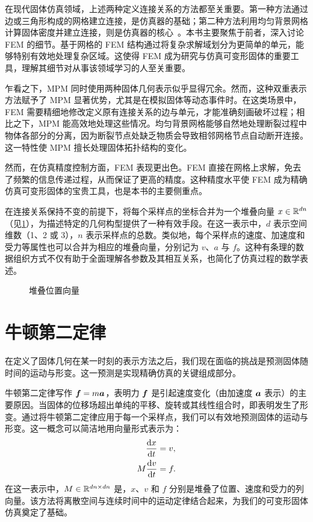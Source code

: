 在现代固体仿真领域，上述两种定义连接关系的方法都至关重要。第一种方法通过边或三角形构成的网格建立连接，是仿真器的基础；第二种方法利用均匀背景网格计算固体密度并建立连接，则是仿真器的核心~\cite{jiang2016material}。本书主要聚焦于前者，深入讨论 FEM 的细节。基于网格的 FEM 结构通过将复杂求解域划分为更简单的单元，能够特别有效地处理复杂区域。这使得 FEM 成为研究与仿真可变形固体的重要工具，理解其细节对从事该领域学习的人至关重要。

乍看之下，MPM 同时使用两种固体几何表示似乎显得冗余。然而，这种双重表示方法赋予了 MPM 显著优势，尤其是在模拟固体等动态事件时。在这类场景中，FEM 需要精细地修改定义原有连接关系的边与单元，才能准确刻画破坏过程；相比之下，MPM 能高效地处理这些情况。均匀背景网格能够自然地处理断裂过程中物体各部分的分离，因为断裂节点处缺乏物质会导致相邻网格节点自动断开连接。这一特性使 MPM 擅长处理固体拓扑结构的变化。

然而，在仿真精度控制方面，FEM 表现更出色。FEM 直接在网格上求解，免去了频繁的信息传递过程，从而保证了更高的精度。这种精度水平使 FEM 成为精确仿真可变形固体的宝贵工具，也是本书的主要侧重点。

在连接关系保持不变的前提下，将每个采样点的坐标合并为一个堆叠向量 $x \in \mathbb{R}^{dn}$（见\allowbreak\cref{fig:lec1:stacked_var}），为描述特定的几何构型提供了一种有效手段。在这一表示中，$d$ 表示空间维数（1、2 或 3），$n$ 表示采样点的总数。类似地，每个采样点的速度、加速度和受力等属性也可以合并为相应的堆叠向量，分别记为 $v$、$a$ 与 $f$。这种有条理的数据组织方式不仅有助于全面理解各参数及其相互关系，也简化了仿真过程的数学表述。

\begin{figure}[htbp]
  \centering
  
  \caption{堆叠位置向量}
  \label{fig:lec1:stacked_var}
\end{figure}

\section{牛顿第二定律}
\label{sec:newtons-second-law}

在定义了固体几何在某一时刻的表示方法之后，我们现在面临的挑战是预测固体随时间的运动与形变。这一预测是实现精确仿真的关键组成部分。

牛顿第二定律写作 $\boldsymbol{f} = m\boldsymbol{a}$，表明力 $\boldsymbol{f}$ 是引起速度变化（由加速度 $\boldsymbol{a}$ 表示）的主要原因。当固体的位移场超出单纯的平移、旋转或其线性组合时，即表明发生了形变。通过将牛顿第二定律应用于每一个采样点，我们可以有效地预测固体的运动与形变。这一概念可以简洁地用向量形式表示为：
\begin{equation}
  \label{eq:lec1:governing_discSpace_contTime}
  \begin{aligned}
    \frac{\mathrm{d} x}{\mathrm{d} t} &= v, \\
    M\frac{\mathrm{d} v}{\mathrm{d} t} &= f.
  \end{aligned}
\end{equation}
在这一表示中，$M \in \mathbb{R}^{dn \times dn}$ 是，$x$、$v$ 和 $f$ 分别是堆叠了位置、速度和受力的列向量。该方法将离散空间与连续时间中的运动定律结合起来，为我们的可变形固体仿真奠定了基础。

